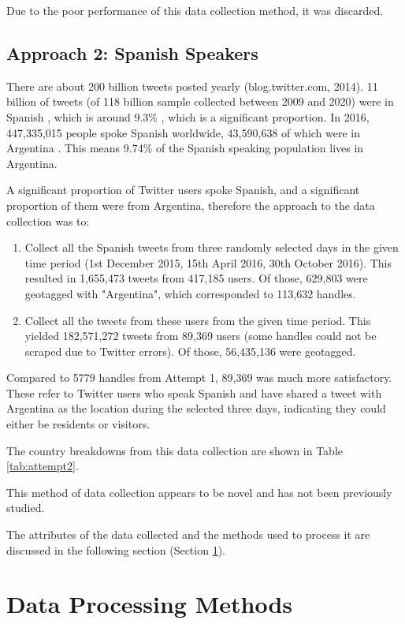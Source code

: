 Due to the poor performance of this data collection method, it was discarded.

\subsection{Approach 2: Spanish Speakers} \label{approach-2}

There are about 200 billion tweets posted yearly (blog.twitter.com, 2014). 11 billion of tweets (of 118 billion sample collected between 2009 and 2020) were in Spanish \cite{alshaabi_growing_2021}, which is around 9.3\% , which is a significant proportion. 
In 2016, 447,335,015 people spoke Spanish worldwide, 43,590,638 of which were in Argentina \cite{vitores_espanol_2016}. This means 9.74\% of the Spanish speaking population lives in Argentina. 

A significant proportion of Twitter users spoke Spanish, and a significant proportion of them were from Argentina, therefore the approach to the data collection was to:

\begin{enumerate}
    \item Collect all the Spanish tweets from three randomly selected days in the given time period (1st December 2015, 15th April 2016, 30th October 2016). This resulted in 1,655,473 tweets from 417,185 users. Of those, 629,803 were geotagged with "Argentina", which corresponded to 113,632 handles.
    \item Collect all the tweets from these users from the given time period. This yielded 182,571,272 tweets from 89,369 users (some handles could not be scraped due to Twitter errors). Of those, 56,435,136 were geotagged.
\end{enumerate}

Compared to 5779 handles from Attempt 1, 89,369 was much more satisfactory. These refer to Twitter users who speak Spanish and have shared a tweet with Argentina as the location during the selected three days, indicating they could either be residents or visitors.

The country breakdowns from this data collection are shown in Table \ref{tab:attempt2}.

This method of data collection appears to be novel and has not been previously studied.

The attributes of the data collected and the methods used to process it are discussed in the following section (Section \ref{data-processing}).

\section{Data Processing Methods} \label{data-processing}


